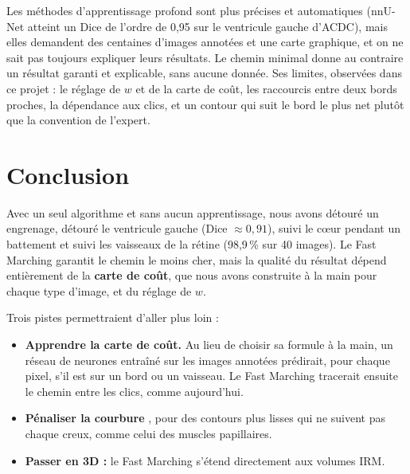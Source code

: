 \documentclass[11pt,a4paper]{article}
\begin{document}
Les méthodes d'apprentissage profond sont plus précises et automatiques (nnU-Net atteint un Dice de l'ordre de
0,95 sur le ventricule gauche d'ACDC), mais elles demandent des centaines d'images annotées et une carte
graphique, et on ne sait pas toujours expliquer leurs résultats. Le chemin minimal donne au contraire un
résultat garanti et explicable, sans aucune donnée. Ses limites, observées dans ce projet : le réglage de $w$
et de la carte de coût, les raccourcis entre deux bords proches, la dépendance aux clics, et un contour qui
suit le bord le plus net plutôt que la convention de l'expert.

\section{Conclusion}

Avec un seul algorithme et sans aucun apprentissage, nous avons détouré un engrenage, détouré le ventricule
gauche (Dice $\approx 0{,}91$), suivi le cœur pendant un battement et suivi les vaisseaux de la rétine
(98,9\,\% sur 40 images). Le Fast Marching garantit le chemin le moins cher, mais la qualité du résultat
dépend entièrement de la \textbf{carte de coût}, que nous avons construite à la main pour chaque type
d'image, et du réglage de $w$.

Trois pistes permettraient d'aller plus loin :
\begin{itemize}[nosep,leftmargin=*]
  \item \textbf{Apprendre la carte de coût.} Au lieu de choisir sa formule à la main, un réseau de neurones
    entraîné sur les images annotées prédirait, pour chaque pixel, s'il est sur un bord ou un vaisseau. Le Fast
    Marching tracerait ensuite le chemin entre les clics, comme aujourd'hui.
  \item \textbf{Pénaliser la courbure} \cite{chen17}, pour des contours plus lisses qui ne suivent pas chaque
    creux, comme celui des muscles papillaires.
  \item \textbf{Passer en 3D :} le Fast Marching s'étend directement aux volumes IRM.
\end{itemize}
\end{document}
